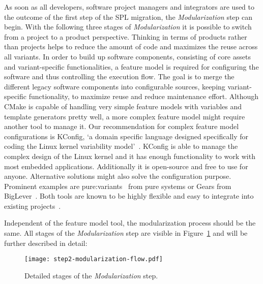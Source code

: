 As soon as all developers, software project managers and integrators are used to
the outcome of the first step of the SPL migration, the \textit{Modularization}
step can begin. With the following three stages of \textit{Modularization} it is
possible to switch from a project to a product perspective. Thinking in terms of
products rather than projects helps to reduce the amount of code and maximizes
the reuse across all variants. In order to build up software components,
consisting of core assets and variant-specific functionalities, a feature model
is required for configuring the software and thus controlling the execution
flow. The goal is to merge the different legacy software components into
configurable sources, keeping variant-specific functionality, to maximize reuse
and reduce maintenance effort. Although CMake is capable of handling very simple
feature models with variables and template generators pretty well, a more
complex feature model might require another tool to manage it. Our
recommendation for complex feature model configurations is KConfig, `a domain
specific language designed specifically for coding the Linux kernel variability
model'~\cite[page 3]{kconfigKernel}. KConfig is able to manage the complex
design of the Linux kernel and it has enough functionality to work with most
embedded applications. Additionally it is open-source and free to use for
anyone. Alternative solutions might also solve the configuration purpose.
Prominent examples are pure:variants~\cite{pureVariantsPureSystems} from pure
systems or Gears from BigLever~\cite{gearsBigLever}. Both tools are known to be
highly flexible and easy to integrate into existing
projects~\cite{confsplcGrunerBKR20}.

Independent of the feature model tool, the modularization process should be the same.
All stages of the \textit{Modularization} step are visible in
Figure~\ref{fig:step2Modularization} and will be further described in detail:

\begin{figure}
  \centering
  \texttt{[image: step2-modularization-flow.pdf]}
  \caption{Detailed stages of the \textit{Modularization} step.}
  \label{fig:step2Modularization}
\end{figure}

